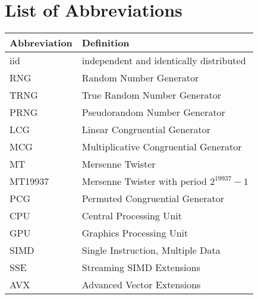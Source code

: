 \documentclass{stdlocal}
\begin{document}
  \section*{List of Abbreviations}

  \begin{table}[H]
    \center
    \renewcommand{\arraystretch}{1.3}
    \begin{tabularx}{\textwidth}{lX}
      \hline
      \textbf{Abbreviation} & \textbf{Definition} \\
      \hline
      \hline
      iid & independent and identically distributed \\
      RNG & Random Number Generator \\
      TRNG & True Random Number Generator \\
      PRNG & Pseudorandom Number Generator \\
      LCG & Linear Congruential Generator \\
      MCG & Multiplicative Congruential Generator \\
      MT & Mersenne Twister \\
      MT19937 & Mersenne Twister with period $2^{19937}-1$ \\
      PCG & Permuted Congruential Generator \\
      CPU & Central Processing Unit \\
      GPU & Graphics Processing Unit \\
      SIMD & Single Instruction, Multiple Data \\
      SSE & Streaming SIMD Extensions \\
      AVX & Advanced Vector Extensions \\
      \hline
    \end{tabularx}
  \end{table}
\end{document}
